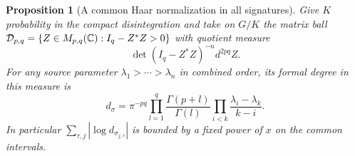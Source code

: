 \documentclass[a4paper,11pt]{article}
\newtheorem{proposition}{Proposition}[section]
\theoremstyle{definition}
\theoremstyle{remark}
\numberwithin{equation}{section}
\begin{document}
\begin{proposition}[A common Haar normalization in all signatures]
\label{prop:degree189}
Give \(K\) probability in the compact disintegration and
take on \(G/K\) the matrix ball
\(\mathcal D_{p,q}=\{Z\in M_{p,q}(\mathbb C): I_q-Z^*Z>0\}\)
with quotient measure
\[
               \det(I_q-Z^*Z)^{-n}d^{2pq}Z .
\]
For any source parameter \(\lambda_1>\cdots>\lambda_n\)
in combined order, its formal degree in this measure is
\begin{equation}
 d_\sigma=
 \pi^{-pq}\prod_{l=1}^q\frac{\Gamma(p+l)}{\Gamma(l)}
       \prod_{i<k}\frac{\lambda_i-\lambda_k}{k-i}.
                                                      \label{eq:degrees189}
\end{equation}
In particular \(\sum_{\tau,j}|\log d_{\sigma_{j,\tau}}|\)
is bounded by a fixed power of \(x\) on the common intervals.
\end{proposition}
\end{document}
